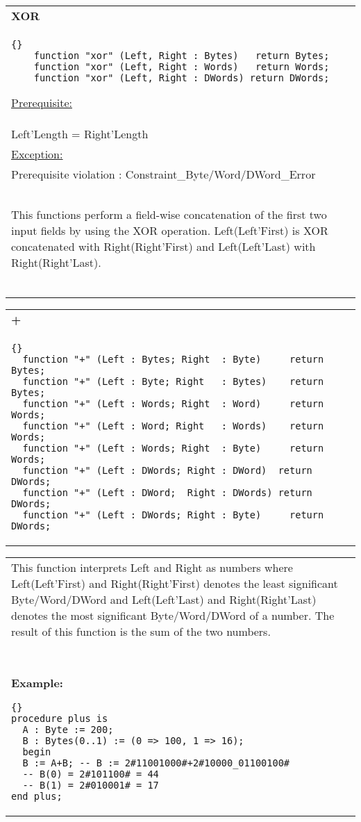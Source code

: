 \begin{tabular}{p{\textwidth}}
  \textbf{XOR}\ \\
  \begin{lstlisting}{}
    function "xor" (Left, Right : Bytes)   return Bytes;
    function "xor" (Left, Right : Words)   return Words;
    function "xor" (Left, Right : DWords) return DWords;
  \end{lstlisting}
  \underline{Prerequisite:}\\ Left'Length = Right'Length\\
  \underline{Exception:}\\
  Prerequisite violation :  Constraint\_Byte/Word/DWord\_Error\\ \ \\
  This functions perform a field-wise concatenation of the first two input 
  fields by
  using the XOR operation. Left(Left'First) is XOR concatenated with
  Right(Right'First) and Left(Left'Last) with Right(Right'Last).\\ \ \\
  \hline\\
\end{tabular}


\begin{tabular}{p{\textwidth}}
 \textbf{+}\ \\
\begin{lstlisting}{}
  function "+" (Left : Bytes; Right  : Byte)     return Bytes;
  function "+" (Left : Byte; Right   : Bytes)    return Bytes;
  function "+" (Left : Words; Right  : Word)     return Words;
  function "+" (Left : Word; Right   : Words)    return Words;
  function "+" (Left : Words; Right  : Byte)     return Words;
  function "+" (Left : DWords; Right : DWord)  return DWords;
  function "+" (Left : DWord;  Right : DWords) return DWords;
  function "+" (Left : DWords; Right : Byte)     return DWords;
\end{lstlisting}
\end{tabular}

\begin{tabular}{p{\textwidth}}
  This function interprets Left and Right as numbers where Left(Left'First)
  and Right(Right'First) denotes the least significant Byte/Word/DWord and
  Left(Left'Last) and Right(Right'Last) denotes the most significant
  Byte/Word/DWord of a number.
  The result of this function is the sum of the two numbers. \\ \ \\
  \textbf{Example:}
\begin{lstlisting}{}
procedure plus is 
  A : Byte := 200;
  B : Bytes(0..1) := (0 => 100, 1 => 16); 
  begin
  B := A+B; -- B := 2#11001000#+2#10000_01100100# 
  -- B(0) = 2#101100# = 44
  -- B(1) = 2#010001# = 17
end plus;
\end{lstlisting}
\end{tabular}


